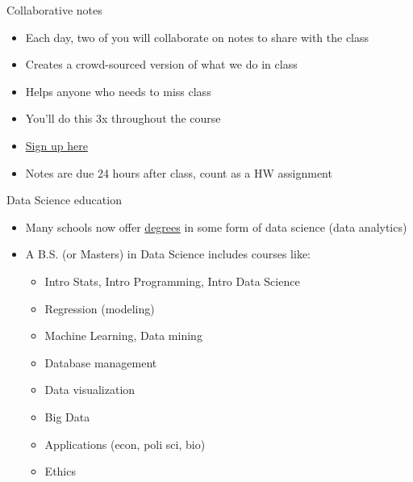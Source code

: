 \documentclass[
  10pt,
  ignorenonframetext,
]{beamer}
\providecommand{\tightlist}{%
  \setlength{\itemsep}{0pt}\setlength{\parskip}{0pt}}
\begin{document}
\begin{frame}{Collaborative notes}
\protect\hypertarget{collaborative-notes}{}
\begin{itemize}
\item Each day, two of you will collaborate on notes to share with the class
\item Creates a crowd-sourced version of what we do in class
\item Helps anyone who needs to miss class
\item You'll do this 3x throughout the course
\item \href{https://drive.google.com/drive/folders/1xgSlButXtTHNvZCi9QkhOv3YSBDeB1UH?usp=sharing}{Sign up here}
\item Notes are due 24 hours after class, count as a HW assignment
\end{itemize}
\end{frame}

\begin{frame}{Data Science education}
\protect\hypertarget{data-science-education}{}
\begin{itemize}
\tightlist
\item
  Many schools now offer
  \href{http://datascience.community/colleges}{degrees} in some form of
  data science (data analytics)
\item
  A B.S. (or Masters) in Data Science includes courses like:

  \begin{itemize}
  \tightlist
  \item
    Intro Stats, Intro Programming, Intro Data Science
  \item
    Regression (modeling)
  \item
    Machine Learning, Data mining
  \item
    Database management
  \item
    Data visualization
  \item
    Big Data
  \item
    Applications (econ, poli sci, bio)
  \item
    Ethics
  \end{itemize}
\end{itemize}
\end{frame}
\end{document}

